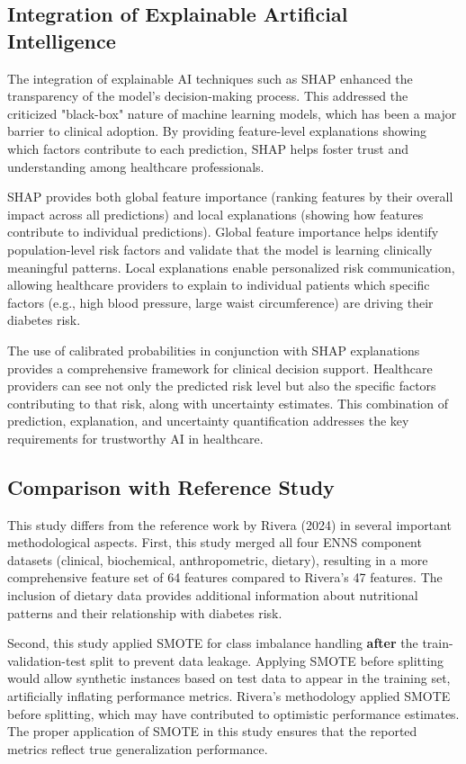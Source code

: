 \subsection{Integration of Explainable Artificial Intelligence}

The integration of explainable AI techniques such as SHAP enhanced the transparency of the model's decision-making process. This addressed the criticized "black-box" nature of machine learning models, which has been a major barrier to clinical adoption. By providing feature-level explanations showing which factors contribute to each prediction, SHAP helps foster trust and understanding among healthcare professionals.

SHAP provides both global feature importance (ranking features by their overall impact across all predictions) and local explanations (showing how features contribute to individual predictions). Global feature importance helps identify population-level risk factors and validate that the model is learning clinically meaningful patterns. Local explanations enable personalized risk communication, allowing healthcare providers to explain to individual patients which specific factors (e.g., high blood pressure, large waist circumference) are driving their diabetes risk.

The use of calibrated probabilities in conjunction with SHAP explanations provides a comprehensive framework for clinical decision support. Healthcare providers can see not only the predicted risk level but also the specific factors contributing to that risk, along with uncertainty estimates. This combination of prediction, explanation, and uncertainty quantification addresses the key requirements for trustworthy AI in healthcare.

\subsection{Comparison with Reference Study}

This study differs from the reference work by Rivera (2024) in several important methodological aspects. First, this study merged all four ENNS component datasets (clinical, biochemical, anthropometric, dietary), resulting in a more comprehensive feature set of 64 features compared to Rivera's 47 features. The inclusion of dietary data provides additional information about nutritional patterns and their relationship with diabetes risk.

Second, this study applied SMOTE for class imbalance handling \textbf{after} the train-validation-test split to prevent data leakage. Applying SMOTE before splitting would allow synthetic instances based on test data to appear in the training set, artificially inflating performance metrics. Rivera's methodology applied SMOTE before splitting, which may have contributed to optimistic performance estimates. The proper application of SMOTE in this study ensures that the reported metrics reflect true generalization performance.

